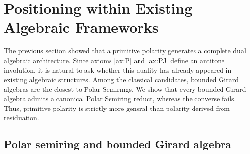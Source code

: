 
\section{Positioning within Existing Algebraic Frameworks}\label{sec:positioning}

The previous section showed that a primitive polarity generates a complete dual algebraic architecture. Since axioms \eqref{ax:P} and \eqref{ax:PJ} define an antitone involution, it is natural to ask whether this duality has already appeared in existing algebraic structures. Among the classical candidates, bounded Girard algebras are the closest to Polar Semirings. We show that every bounded Girard algebra admits a canonical Polar Semiring reduct, whereas the converse fails. Thus, primitive polarity is strictly more general than polarity derived from residuation.

\subsection{Polar semiring and bounded Girard algebra}
\label{subsec:bga-defn}

